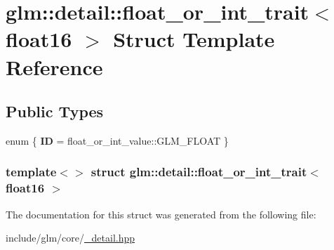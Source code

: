 \hypertarget{structglm_1_1detail_1_1float__or__int__trait_3_01float16_01_4}{\section{glm\-:\-:detail\-:\-:float\-\_\-or\-\_\-int\-\_\-trait$<$ float16 $>$ \-Struct \-Template \-Reference}
\label{structglm_1_1detail_1_1float__or__int__trait_3_01float16_01_4}
}
\subsection*{\-Public \-Types}
\begin{DoxyCompactItemize}
\item 
enum \{ {\bfseries \-I\-D} =  float\-\_\-or\-\_\-int\-\_\-value\-:\-:\-G\-L\-M\-\_\-\-F\-L\-O\-A\-T
 \}
\end{DoxyCompactItemize}
\subsubsection*{template$<$$>$ struct glm\-::detail\-::float\-\_\-or\-\_\-int\-\_\-trait$<$ float16 $>$}



\-The documentation for this struct was generated from the following file\-:\begin{DoxyCompactItemize}
\item 
include/glm/core/\hyperlink{__detail_8hpp}{\-\_\-detail.\-hpp}\end{DoxyCompactItemize}
